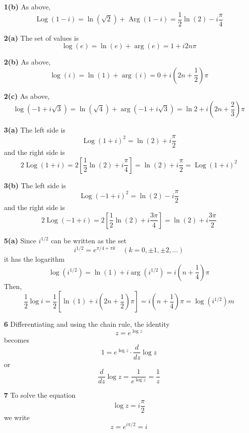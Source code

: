 \documentclass{article}
\DeclareMathOperator{\Log}{Log}
\DeclareMathOperator{\Arg}{Arg}
\begin{document}
\textbf{1(b)}
As above,
\[
	\Log(1 - i) = \ln(\sqrt{2}) + \Arg(1 - i)
	= \frac{1}{2}\ln(2) - i\frac{\pi}{4}
\]

\textbf{2(a)}
The set of values is
\[
	\log(e) = \ln(e) + \arg(e) 
	= 1 + i2n\pi
\]

\textbf{2(b)}
As above,
\[
	\log(i) = \ln(1) + \arg(i)
	= 0 + i\left(2n + \frac{1}{2}\right) \pi
\]

\textbf{2(c)}
As above,
\[
	\log(-1 + i\sqrt{3}) = \ln(\sqrt{4}) + \arg(-1 + i\sqrt{3})
	= \ln 2 + i\left(2n + \frac{2}{3}\right) \pi
\]

\textbf{3(a)}
The left side is
\[
	\Log(1 + i)^2 = \ln(2) + i \frac{\pi}{2}
\]
and the right side is
\[
	2\Log(1 + i) = 2 \left[ \frac{1}{2} \ln(2) + i\frac{\pi}{4} \right]
	= \ln(2) + i\frac{\pi}{2}
	= \Log(1 + i)^2
\]

\textbf{3(b)}
The left side is
\[
	\Log(-1 + i)^2 = \ln(2) - i \frac{\pi}{2}
\]
and the right side is
\[
	2 \Log(-1 + i) = 2 \left[ \frac{1}{2} \ln(2) + i\frac{3\pi}{4} \right]
	= \ln(2) + i\frac{3\pi}{2}
\]

\textbf{5(a)}
Since $i^{1/2}$ can be written as the set
\[
	i^{1/2} = e^{\pi/4 + \pi k}		\quad (k = 0, \pm 1, \pm 2, \dots)
\]
it has the logarithm
\[
	\log(i^{1/2}) = \ln(1) + i \arg(i^{1/2})
	= i \left( n + \frac{1}{4} \right) \pi
\]
Then,
\[
	\frac{1}{2} \log i
	= \frac{1}{2} \left[ \ln(1) + i\left(2n + \frac{1}{2}\right)\pi \right]
	= i\left( n + \frac{1}{4} \right) \pi
	= \log(i^{1/2})m
\]

\textbf{6}
Differentiating and using the chain rule, the identity
\[
	z = e^{\log z}
\]
becomes
\[
	1 = e^{\log z} \cdot \frac{d}{dz} \log z
\]
or
\[
	\frac{d}{dz} \log z = \frac{1}{e^{\log z}} = \frac{1}{z}
\]

\textbf{7}
To solve the equation
\[
	\log z = i\frac{\pi}{2}
\]
we write
\[
	z = e^{i \pi/2} = i
\]
\end{document}
